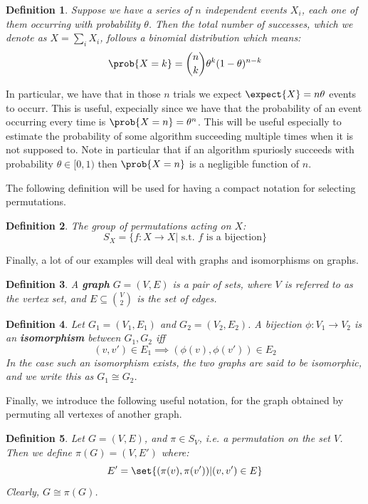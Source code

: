 \documentclass{article}
\newtheorem{definition}{Definition}
\begin{document}
\begin{definition}
    Suppose we have a series of $n$ independent events $X_i$, each one of them
    occurring with probability $\theta$. Then the total number of successes, which we denote as $X = \sum_i X_i$, follows a binomial distribution which means:
    \[ \prob{X = k} = \binom{n}{k} \theta^k (1 - \theta)^{n - k} \]
\end{definition}
In particular, we have that in those $n$ trials we expect $\expect{X} = n\theta$ events to occurr. This is useful, expecially since
we have that the probability of an event occurring every time is $\prob{X = n} = \theta^n$. This will be useful especially
to  estimate the probability of some algorithm succeeding multiple times when it is not supposed to.
Note in particular that if an algorithm spuriosly succeeds with probability $\theta \in [0, 1)$ then $\prob{X = n}$ is a
negligible function of $n$. \par

The following definition will be used for having a compact notation for selecting permutations.

\begin{definition}
    The group of permutations acting on $X$:
    \[ S_X = \{ f: X \to X | \text{ s.t. } f \text{ is a bijection} \} \]
\end{definition}

Finally, a lot of our examples will deal with graphs and isomorphisms on graphs.

\begin{definition}
    A \textbf{graph} $G = (V, E)$ is a pair of sets, where $V$ is referred to as the vertex set, and $E \subseteq \binom{V}{2}$ is the set of edges.
\end{definition}

\begin{definition}
    Let $G_1 = (V_1, E_1)$ and $G_2 = (V_2, E_2)$. A bijection $\phi: V_1 \to V_2$ is an \textbf{isomorphism} between $G_1, G_2$ iff
    \[ (v, v') \in E_1 \implies (\phi(v), \phi(v')) \in E_2 \]
    In the case such an isomorphism exists, the two graphs are said to be isomorphic, and we write this as $G_1 \cong G_2$.
\end{definition}

Finally, we introduce the following useful notation, for the graph obtained by permuting all vertexes of another graph.
\begin{definition}
    Let $G = (V, E)$, and $\pi \in S_V$, i.e. a permutation on the set $V$. Then we define $\pi(G) = (V, E')$ where:
    \[ E' = \set{ (\pi(v), \pi(v')) | (v, v') \in E } \]
    Clearly, $G \cong \pi(G)$.
\end{definition}
\end{document}
